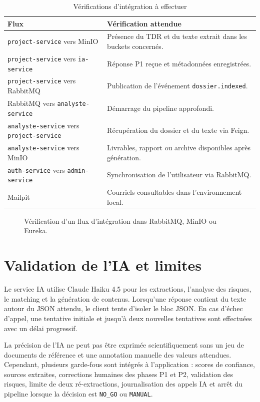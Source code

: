 \begin{table}[H]
\centering
\caption{Vérifications d'intégration à effectuer}
\label{tab:integration}
\begin{tabularx}{\textwidth}{p{5.5cm}Y}
\toprule
\textbf{Flux} & \textbf{Vérification attendue} \\
\midrule
\texttt{project-service} vers MinIO & Présence du TDR et du texte extrait dans les buckets concernés. \\
\texttt{project-service} vers \texttt{ia-service} & Réponse P1 reçue et métadonnées enregistrées. \\
\texttt{project-service} vers RabbitMQ & Publication de l'événement \texttt{dossier.indexed}. \\
RabbitMQ vers \texttt{analyste-service} & Démarrage du pipeline approfondi. \\
\texttt{analyste-service} vers \texttt{project-service} & Récupération du dossier et du texte via Feign. \\
\texttt{analyste-service} vers MinIO & Livrables, rapport ou archive disponibles après génération. \\
\texttt{auth-service} vers \texttt{admin-service} & Synchronisation de l'utilisateur via RabbitMQ. \\
Mailpit & Courriels consultables dans l'environnement local. \\
\bottomrule
\end{tabularx}
\end{table}

\begin{figure}[H]
\centering
\vspace{5cm}
\caption{Vérification d'un flux d'intégration dans RabbitMQ, MinIO ou Eureka.}
\label{fig:integration}
\end{figure}

\section{Validation de l'IA et limites}

Le service IA utilise Claude Haiku 4.5 pour les extractions, l'analyse des risques, le matching et la génération de contenus. Lorsqu'une réponse contient du texte autour du JSON attendu, le client tente d'isoler le bloc JSON. En cas d'échec d'appel, une tentative initiale et jusqu'à deux nouvelles tentatives sont effectuées avec un délai progressif.

La précision de l'IA ne peut pas être exprimée scientifiquement sans un jeu de documents de référence et une annotation manuelle des valeurs attendues. Cependant, plusieurs garde-fous sont intégrés à l'application : scores de confiance, sources extraites, corrections humaines des phases P1 et P2, validation des risques, limite de deux ré-extractions, journalisation des appels IA et arrêt du pipeline lorsque la décision est \texttt{NO\_GO} ou \texttt{MANUAL}.


